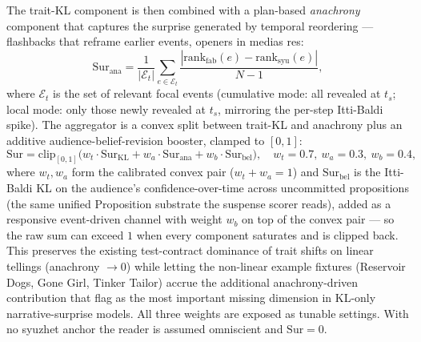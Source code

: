 \documentclass[11pt]{article}
\begin{document}
The trait-KL component is then combined with a plan-based
\emph{anachrony} component
\citep{baeyoung2008surprise,tobin2018elements,bissell2025surprise}
that captures the surprise generated by temporal reordering ---
flashbacks that reframe earlier events, openers in medias res:
\begin{equation}
\mathrm{Sur}_{\mathrm{ana}} = \frac{1}{|\mathcal{E}_t|}\!\!\sum_{e \in \mathcal{E}_t}\!\! \frac{|\mathrm{rank}_{\mathrm{fab}}(e) - \mathrm{rank}_{\mathrm{syu}}(e)|}{N - 1},
\end{equation}
where $\mathcal{E}_t$ is the set of relevant focal events
(cumulative mode: all revealed at $t_s$; local mode: only those
newly revealed at $t_s$, mirroring the per-step Itti-Baldi
spike). The aggregator is a convex split between trait-KL and anachrony plus
an additive audience-belief-revision booster, clamped to $[0,1]$:
\begin{equation}
\mathrm{Sur} = \mathrm{clip}_{[0,1]}\!\big(w_t \cdot \mathrm{Sur}_{\mathrm{KL}} + w_a \cdot \mathrm{Sur}_{\mathrm{ana}} + w_b \cdot \mathrm{Sur}_{\mathrm{bel}}\big), \quad w_t = 0.7,\ w_a = 0.3,\ w_b = 0.4,
\end{equation}
where $w_t,w_a$ form the calibrated convex pair ($w_t+w_a=1$) and
$\mathrm{Sur}_{\mathrm{bel}}$ is the Itti-Baldi KL on the audience's
confidence-over-time across uncommitted propositions (the same unified
Proposition substrate the suspense scorer reads), added as a responsive
event-driven channel with weight $w_b$ on top of the convex pair --- so
the raw sum can exceed $1$ when every component saturates and is clipped
back. This preserves the existing test-contract dominance of trait
shifts on linear tellings (anachrony $\to 0$) while letting the
non-linear example fixtures (Reservoir Dogs, Gone Girl, Tinker
Tailor) accrue the additional anachrony-driven contribution
that \citet{bissell2025surprise} flag as the most important
missing dimension in KL-only narrative-surprise models. All three
weights are exposed as tunable settings. With no
syuzhet anchor the reader is assumed omniscient and
$\mathrm{Sur} = 0$.
\end{document}

